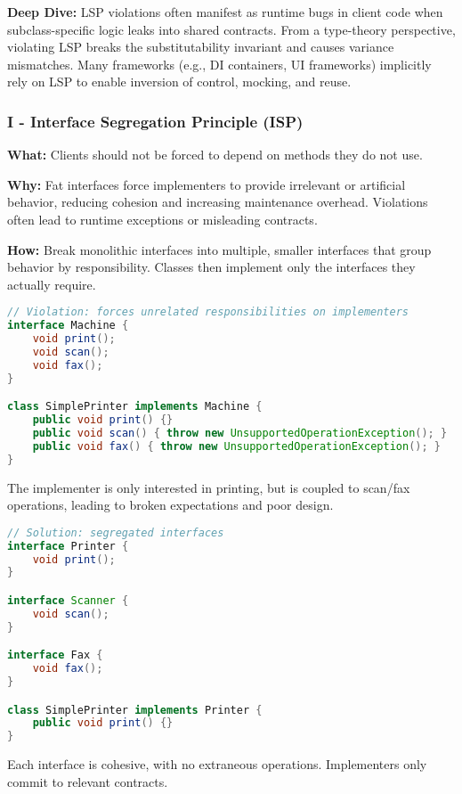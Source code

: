 \documentclass[a4paper,12pt]{article}
\begin{document}
\textbf{Deep Dive:}  
LSP violations often manifest as runtime bugs in client code when subclass-specific logic leaks into shared contracts. From a type-theory perspective, violating LSP breaks the substitutability invariant and causes variance mismatches. Many frameworks (e.g., DI containers, UI frameworks) implicitly rely on LSP to enable inversion of control, mocking, and reuse.

\subsubsection{I - Interface Segregation Principle (ISP)}

\textbf{What:} Clients should not be forced to depend on methods they do not use.

\textbf{Why:} Fat interfaces force implementers to provide irrelevant or artificial behavior, reducing cohesion and increasing maintenance overhead. Violations often lead to runtime exceptions or misleading contracts.

\textbf{How:} Break monolithic interfaces into multiple, smaller interfaces that group behavior by responsibility. Classes then implement only the interfaces they actually require.

\begin{lstlisting}[language=Java]
// Violation: forces unrelated responsibilities on implementers
interface Machine {
    void print();
    void scan();
    void fax();
}

class SimplePrinter implements Machine {
    public void print() {}
    public void scan() { throw new UnsupportedOperationException(); }
    public void fax() { throw new UnsupportedOperationException(); }
}
\end{lstlisting}

The implementer is only interested in printing, but is coupled to scan/fax operations, leading to broken expectations and poor design.

\begin{lstlisting}[language=Java]
// Solution: segregated interfaces
interface Printer {
    void print();
}

interface Scanner {
    void scan();
}

interface Fax {
    void fax();
}

class SimplePrinter implements Printer {
    public void print() {}
}
\end{lstlisting}

Each interface is cohesive, with no extraneous operations. Implementers only commit to relevant contracts.
\end{document}
